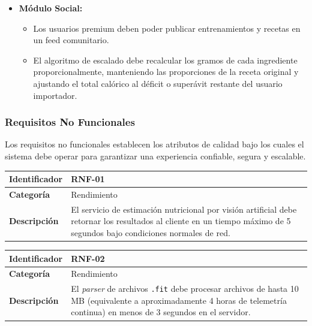 \documentclass[12pt]{article}
\begin{document}
\begin{itemize}
    \begin{itemize}
        \item El motor debe calcular diariamente la carga aguda (ATL) y crónica (CTL) del atleta, utilizando un modelo de media móvil exponencial ponderada.
        \item Las alertas de fatiga cruzada deben generarse cuando el ratio ATL/CTL supere un umbral configurable y exista una sesión de la disciplina opuesta programada en las próximas 24 horas.
    \end{itemize}
    \item \textbf{Módulo Social:}
    \begin{itemize}
        \item Los usuarios premium deben poder publicar entrenamientos y recetas en un feed comunitario.
        \item El algoritmo de escalado debe recalcular los gramos de cada ingrediente proporcionalmente, manteniendo las proporciones de la receta original y ajustando el total calórico al déficit o superávit restante del usuario importador.
    \end{itemize}
\end{itemize}
\newpage
\subsubsection{Requisitos No Funcionales}
Los requisitos no funcionales establecen los atributos de calidad bajo los cuales el sistema debe operar para garantizar una experiencia confiable, segura y escalable.

\begin{table}[h!]
    \centering
    \renewcommand{\arraystretch}{1.3}
    \begin{tabular}{|p{3.5cm}|p{11.5cm}|}
        \hline
        \rowcolor[HTML]{EFEFEF}
        \textbf{Identificador} & \textbf{RNF-01} \\ \hline
        \textbf{Categoría} & Rendimiento \\ \hline
        \textbf{Descripción} & El servicio de estimación nutricional por visión artificial debe retornar los resultados al cliente en un tiempo máximo de 5 segundos bajo condiciones normales de red. \\ \hline
    \end{tabular}
\end{table}

\begin{table}[h!]
    \centering
    \renewcommand{\arraystretch}{1.3}
    \begin{tabular}{|p{3.5cm}|p{11.5cm}|}
        \hline
        \rowcolor[HTML]{EFEFEF}
        \textbf{Identificador} & \textbf{RNF-02} \\ \hline
        \textbf{Categoría} & Rendimiento \\ \hline
        \textbf{Descripción} & El \textit{parser} de archivos \texttt{.fit} debe procesar archivos de hasta 10 MB (equivalente a aproximadamente 4 horas de telemetría continua) en menos de 3 segundos en el servidor. \\ \hline
    \end{tabular}
\end{table}
\end{document}
